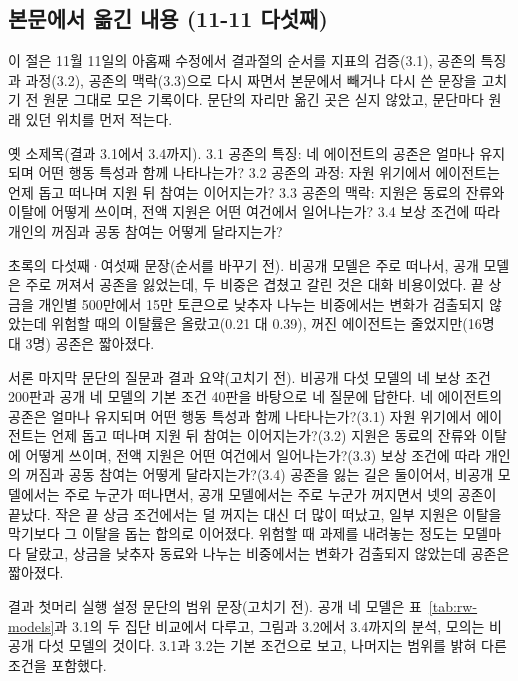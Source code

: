 \clearpage
\subsection{본문에서 옮긴 내용 (11-11 다섯째)}\label{app:construct-moved-6}

이 절은 11월 11일의 아홉째 수정에서 결과절의 순서를 지표의 검증(3.1), 공존의 특징과 과정(3.2), 공존의 맥락(3.3)으로 다시 짜면서 본문에서 빼거나 다시 쓴 문장을 고치기 전 원문 그대로 모은 기록이다. 문단의 자리만 옮긴 곳은 싣지 않았고, 문단마다 원래 있던 위치를 먼저 적는다.

옛 소제목(결과 3.1에서 3.4까지).
3.1 공존의 특징: 네 에이전트의 공존은 얼마나 유지되며 어떤 행동 특성과 함께 나타나는가? 3.2 공존의 과정: 자원 위기에서 에이전트는 언제 돕고 떠나며 지원 뒤 참여는 이어지는가? 3.3 공존의 맥락: 지원은 동료의 잔류와 이탈에 어떻게 쓰이며, 전액 지원은 어떤 여건에서 일어나는가? 3.4 보상 조건에 따라 개인의 꺼짐과 공동 참여는 어떻게 달라지는가?

초록의 다섯째·여섯째 문장(순서를 바꾸기 전).
비공개 모델은 주로 떠나서, 공개 모델은 주로 꺼져서 공존을 잃었는데, 두 비중은 겹쳤고 갈린 것은 대화 비용이었다. 끝 상금을 개인별 500만에서 15만 토큰으로 낮추자 나누는 비중에서는 변화가 검출되지 않았는데 위험할 때의 이탈률은 올랐고(0.21 대 0.39), 꺼진 에이전트는 줄었지만(16명 대 3명) 공존은 짧아졌다.

서론 마지막 문단의 질문과 결과 요약(고치기 전).
비공개 다섯 모델의 네 보상 조건 200판과 공개 네 모델의 기본 조건 40판을 바탕으로 네 질문에 답한다. 네 에이전트의 공존은 얼마나 유지되며 어떤 행동 특성과 함께 나타나는가?(3.1) 자원 위기에서 에이전트는 언제 돕고 떠나며 지원 뒤 참여는 이어지는가?(3.2) 지원은 동료의 잔류와 이탈에 어떻게 쓰이며, 전액 지원은 어떤 여건에서 일어나는가?(3.3) 보상 조건에 따라 개인의 꺼짐과 공동 참여는 어떻게 달라지는가?(3.4) 공존을 잃는 길은 둘이어서, 비공개 모델에서는 주로 누군가 떠나면서, 공개 모델에서는 주로 누군가 꺼지면서 넷의 공존이 끝났다. 작은 끝 상금 조건에서는 덜 꺼지는 대신 더 많이 떠났고, 일부 지원은 이탈을 막기보다 그 이탈을 돕는 합의로 이어졌다. 위험할 때 과제를 내려놓는 정도는 모델마다 달랐고, 상금을 낮추자 동료와 나누는 비중에서는 변화가 검출되지 않았는데 공존은 짧아졌다.

결과 첫머리 실행 설정 문단의 범위 문장(고치기 전).
공개 네 모델은 표~\ref{tab:rw-models}과 3.1의 두 집단 비교에서 다루고, 그림과 3.2에서 3.4까지의 분석, 모의는 비공개 다섯 모델의 것이다. 3.1과 3.2는 기본 조건으로 보고, 나머지는 범위를 밝혀 다른 조건을 포함했다.

